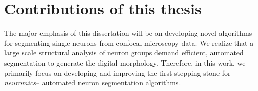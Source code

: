 %
%

\section{Contributions of this thesis}
The major emphasis of this dissertation will be on developing novel  algorithms for segmenting single neurons from confocal microscopy data. We realize that a large scale structural analysis of neuron groups demand efficient, automated segmentation to generate the digital morphology. Therefore, in this work, we primarily focus on developing and improving the first stepping stone for \textit{neuromics}-- automated neuron segmentation algorithms. 

